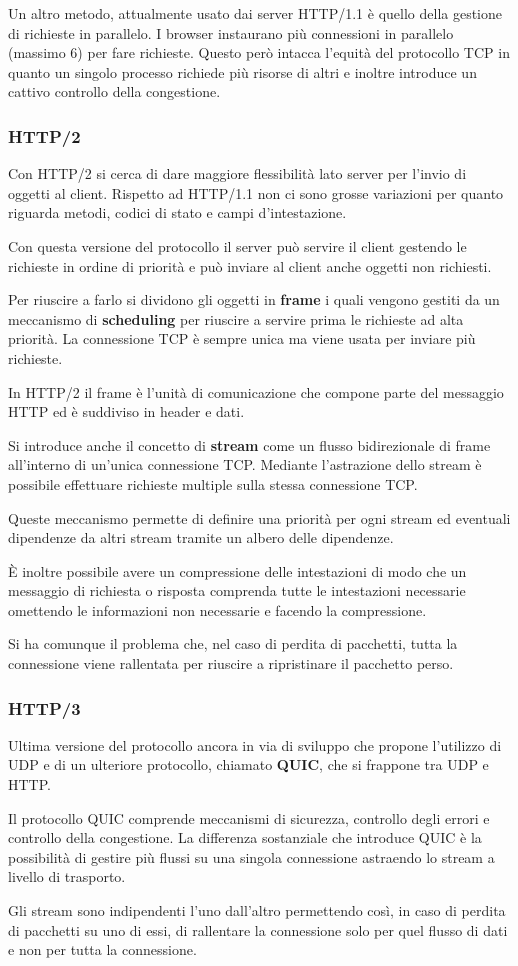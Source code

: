 Un altro metodo, attualmente usato dai server HTTP/1.1 è quello della 
gestione di richieste in parallelo. I browser instaurano più 
connessioni in parallelo (massimo 6) per fare richieste. Questo però 
intacca l'equità del protocollo TCP in quanto un singolo processo 
richiede più risorse di altri e inoltre introduce un cattivo controllo 
della congestione.

\subsubsection{HTTP/2}
Con HTTP/2 si cerca di dare maggiore flessibilità lato server per 
l'invio di oggetti al client. Rispetto ad HTTP/1.1 non ci sono grosse 
variazioni per quanto riguarda metodi, codici di stato e
campi d'intestazione.

Con questa versione del protocollo il server può servire il client 
gestendo le richieste in ordine di priorità e può inviare al client 
anche oggetti non richiesti.

Per riuscire a farlo si dividono gli oggetti in \textbf{frame} i quali 
vengono gestiti da un meccanismo di \textbf{scheduling} per riuscire a 
servire prima le richieste ad alta priorità. La connessione TCP è 
sempre unica ma viene usata per inviare più richieste.

In HTTP/2 il frame è l'unità di comunicazione che compone parte del 
messaggio HTTP ed è suddiviso in header e dati.

Si introduce anche il concetto di \textbf{stream} come un flusso 
bidirezionale di frame all'interno di un'unica connessione TCP.
Mediante l'astrazione dello stream è possibile effettuare richieste
multiple sulla stessa connessione TCP.

Queste meccanismo permette di definire una priorità per ogni stream ed
eventuali dipendenze da altri stream tramite un albero delle 
dipendenze.

\`E inoltre possibile avere un compressione delle intestazioni di modo 
che un messaggio di richiesta o risposta comprenda tutte le 
intestazioni necessarie omettendo le informazioni non necessarie e 
facendo la compressione.

Si ha comunque il problema che, nel caso di perdita di pacchetti, tutta
la connessione viene rallentata per riuscire a ripristinare il 
pacchetto perso.

\subsubsection{HTTP/3}
Ultima versione del protocollo ancora in via di sviluppo che propone 
l'utilizzo di UDP e di un ulteriore protocollo, chiamato \textbf{QUIC},
che si frappone tra UDP e HTTP.

Il protocollo QUIC comprende meccanismi di sicurezza, controllo degli 
errori e controllo della congestione. La differenza sostanziale che 
introduce QUIC è la possibilità di gestire più flussi su una singola 
connessione astraendo lo stream a livello di trasporto.

Gli stream sono indipendenti l'uno dall'altro permettendo così, in caso
di perdita di pacchetti su uno di essi, di rallentare la connessione 
solo per quel flusso di dati e non per tutta la connessione.
